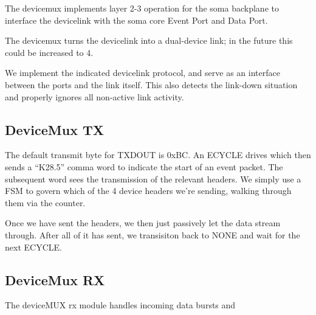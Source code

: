 The devicemux implements layer 2-3 operation for the soma backplane to
interface the devicelink with the soma core Event Port and Data Port. 

The devicemux turns the devicelink into a dual-device link; in the
future this could be increased to 4.

We implement the indicated devicelink protocol, and serve as an
interface between the ports and the link itself. This also detects the
link-down situation and properly ignores all non-active link activity.

\subsection{DeviceMux TX}
The default transmit byte for TXDOUT is 0xBC. An ECYCLE drives
 which then sends a ``K28.5'' comma word to indicate
the start of an event packet. The subsequent word sees the
transmission of the relevant headers. We simply use a FSM to govern
which of the 4 device headers we're sending, walking through them via
the  counter.

Once we have sent the headers, we then just passively let the data stream through. After all of it has sent, we transisiton back to NONE and wait for the next ECYCLE. 

\subsection{DeviceMux RX}

The deviceMUX rx module handles incoming data bursts and 
